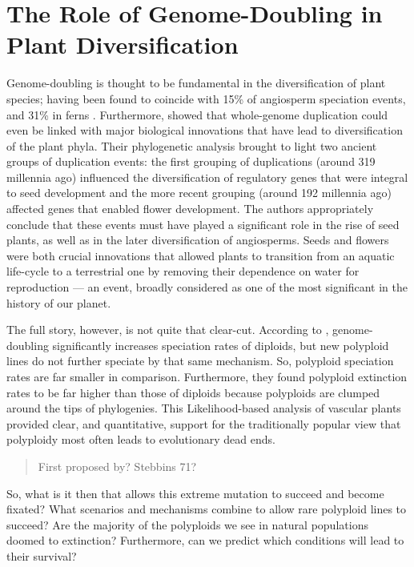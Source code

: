 \documentclass[openany, 12pt, draft]{book}
\begin{document}
\hypertarget{the-role-of-genome-doubling-in-plant-diversification}{%
\section{The Role of Genome-Doubling in Plant Diversification}\label{the-role-of-genome-doubling-in-plant-diversification}}

Genome-doubling is thought to be fundamental in the diversification of plant species; having been found to coincide with 15\% of angiosperm speciation events, and 31\% in ferns \citep{Wood2009}.
Furthermore, \citet{Jiao2011} showed that whole-genome duplication could even be linked with major biological innovations that have lead to diversification of the plant phyla.
Their phylogenetic analysis brought to light two ancient groups of duplication events:
the first grouping of duplications (around 319 millennia ago) influenced the diversification of regulatory genes that were integral to seed development and the more recent grouping (around 192 millennia ago) affected genes that enabled flower development.
The authors appropriately conclude that these events must have played a significant role in the rise of seed plants, as well as in the later diversification of angiosperms.
Seeds and flowers were both crucial innovations that allowed plants to transition from an aquatic life-cycle to a terrestrial one by removing their dependence on water for reproduction --- an event, broadly considered as one of the most significant in the history of our planet.

The full story, however, is not quite that clear-cut.
According to \citet{Mayrose2011}, genome-doubling significantly increases speciation rates of diploids, but new polyploid lines do not further speciate by that same mechanism.
So, polyploid speciation rates are far smaller in comparison.
Furthermore, they found polyploid extinction rates to be far higher than those of diploids because polyploids are clumped around the tips of phylogenies.
This Likelihood-based analysis of vascular plants provided clear, and quantitative, support for the traditionally popular view that polyploidy most often leads to evolutionary dead ends.

\begin{quote}
First proposed by? Stebbins 71?
\end{quote}

So, what is it then that allows this extreme mutation to succeed and become fixated?
What scenarios and mechanisms combine to allow rare polyploid lines to succeed?
Are the majority of the polyploids we see in natural populations doomed to extinction?
Furthermore, can we predict which conditions will lead to their survival?
\end{document}

